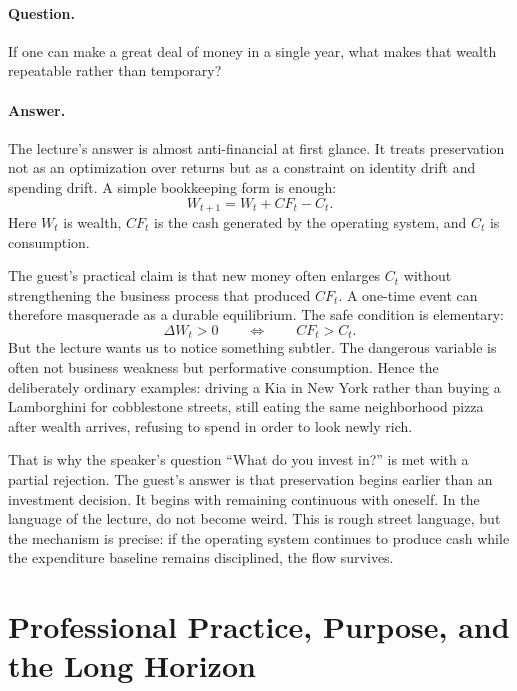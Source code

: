 \paragraph{Question.} If one can make a great deal of money in a single year, what makes that wealth repeatable rather than temporary?

\paragraph{Answer.} The lecture's answer is almost anti-financial at first glance. It treats preservation not as an optimization over returns but as a constraint on identity drift and spending drift. A simple bookkeeping form is enough:
\begin{equation}
W_{t+1} = W_t + CF_t - C_t.
\end{equation}
Here $W_t$ is wealth, $CF_t$ is the cash generated by the operating system, and $C_t$ is consumption.

The guest's practical claim is that new money often enlarges $C_t$ without strengthening the business process that produced $CF_t$. A one-time event can therefore masquerade as a durable equilibrium. The safe condition is elementary:
\begin{equation}
\Delta W_t > 0 \qquad \Longleftrightarrow \qquad CF_t > C_t.
\end{equation}
But the lecture wants us to notice something subtler. The dangerous variable is often not business weakness but performative consumption. Hence the deliberately ordinary examples: driving a Kia in New York rather than buying a Lamborghini for cobblestone streets, still eating the same neighborhood pizza after wealth arrives, refusing to spend in order to look newly rich.

That is why the speaker's question ``What do you invest in?'' is met with a partial rejection. The guest's answer is that preservation begins earlier than an investment decision. It begins with remaining continuous with oneself. In the language of the lecture, do not become weird. This is rough street language, but the mechanism is precise: if the operating system continues to produce cash while the expenditure baseline remains disciplined, the flow survives.

\section{Professional Practice, Purpose, and the Long Horizon}

